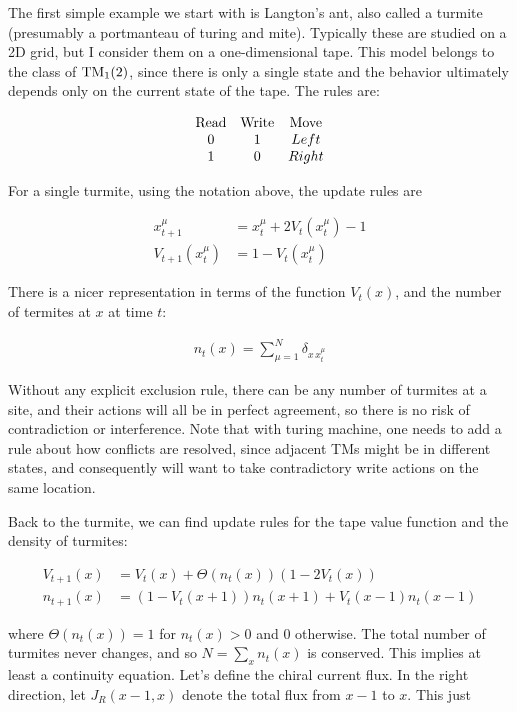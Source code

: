 \documentclass{article}
\begin{document}
The first simple example we start with is Langton's ant, also called a turmite (presumably a portmanteau of turing and mite). Typically these are studied on a 2D grid, but I consider them on a one-dimensional tape. This model belongs to the class of ${\rm TM}_{1}(2)$, since there is only a single state and the behavior ultimately depends only on the current state of the tape. The rules are:


$$\begin{array}{ccc}
{\rm Read} & {\rm Write} & {\rm Move} \\
0 & 1 & Left\\
1 & 0 & Right
\end{array}$$

For a single turmite, using the notation above, the update rules are

\begin{align}
x_{t+1}^{\mu} &= x_{t}^{\mu} + 2 V_{t}(x_{t}^{\mu}) - 1\\
V_{t+1}(x_{t}^{\mu}) & = 1 - V_{t}(x_{t}^{\mu})
\end{align}

There is a nicer representation in terms of the function $V_{t}(x)$, and the number of termites at $x$ at time $t$:

\begin{align}
n_{t}(x) = \sum_{\mu = 1}^{N} \delta_{x \, x_{t}^{\mu}}
\end{align}

Without any explicit exclusion rule, there can be any number of turmites at a site, and their actions will all be in perfect agreement, so there is no risk of contradiction or interference. Note that with turing machine, one needs to add a rule about how conflicts are resolved, since adjacent TMs might be in different states, and consequently will want to take contradictory write actions on the same location. 

Back to the turmite, we can find update rules for the tape value function and the density of turmites:

\begin{align}
V_{t+1}(x) &= V_{t}(x) + \Theta(n_{t}(x)) \left(1 - 2 V_{t}(x)\right)\\
n_{t+1}(x)  & =  \left(1 - V_{t}(x+1)\right) n_{t}(x + 1) + V_{t}(x - 1) n_{t}(x - 1)
\end{align}

where $\Theta(n_{t}(x)) = 1$ for $n_{t}(x) > 0$ and $0$ otherwise. The total number of turmites never changes, and so $N = \sum_{x} n_{t}(x)$ is conserved. This implies at least a continuity equation. Let's define the chiral current flux. In the right direction, let $J_{R}(x-1, x)$ denote the total flux from $x-1$ to $x$. This just
\end{document}
